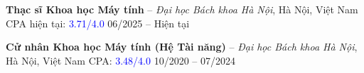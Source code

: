
\begin{cvhonors}

  \cvhonor
    {\textbf{Thạc sĩ Khoa học Máy tính} -- \emph{Đại học Bách khoa Hà Nội}, Hà Nội, Việt Nam \newline CPA hiện tại: \textcolor{blue}{3.71/4.0}}
    {06/2025 -- Hiện tại}

  \cvhonor
    {\textbf{Cử nhân Khoa học Máy tính (Hệ Tài năng)} -- \emph{Đại học Bách khoa Hà Nội}, Hà Nội, Việt Nam \newline CPA: \textcolor{blue}{3.48/4.0}}
    {10/2020 -- 07/2024}


\end{cvhonors}

\vspace{1pt}
